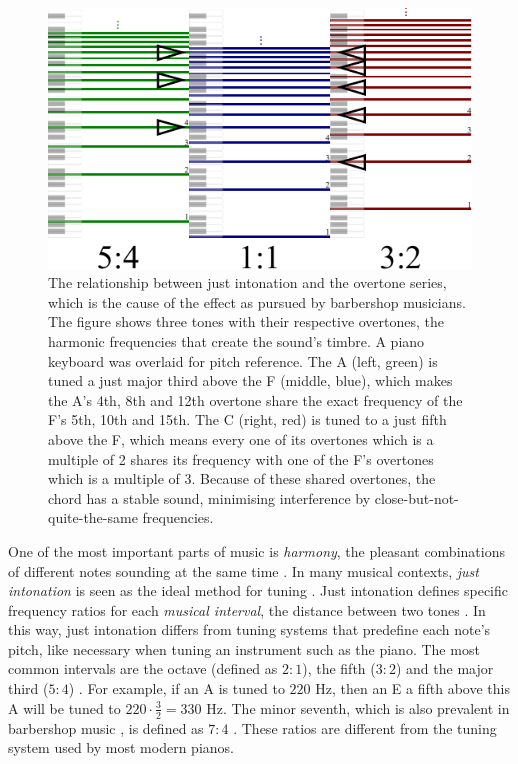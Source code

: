 \documentclass[a4paper]{article}
\begin{document}
\begin{figure}
	\centering
	\includegraphics[height=0.35\textheight]{Figures/overtones.pdf}
	\caption{The relationship between just intonation and the overtone series, which is the cause of the  effect as pursued by barbershop musicians. The figure shows three tones with their respective overtones, the harmonic frequencies that create the sound's timbre. A piano keyboard was overlaid for pitch reference. The A (left, green) is tuned a just major third above the F (middle, blue), which makes the A's 4th, 8th and 12th overtone share the exact frequency of the F's 5th, 10th and 15th. The C (right, red) is tuned to a just fifth above the F, which means every one of its overtones which is a multiple of 2 shares its frequency with one of the F's overtones which is a multiple of 3. Because of these shared overtones, the chord has a stable sound, minimising interference by close-but-not-quite-the-same frequencies.}
	\label{fig:overtones}
\end{figure}

One of the most important parts of music is \textit{harmony}, the pleasant combinations of different notes sounding at the same time \cite{malm_music_1996}. In many musical contexts, {\it just intonation} is seen as the ideal method for tuning \cite{boyden_prelleur_1951}. Just intonation defines specific frequency ratios for each \textit{musical interval}, the distance between two tones \cite{fonville_ben_1991}. In this way, just intonation differs from tuning systems that predefine each note's pitch, like necessary when tuning an instrument such as the piano. The most common intervals are the octave (defined as $2:1$), the fifth ($3:2$) and the major third ($5:4$) \cite{van_de_craats_fis_1989}. For example, if an A is tuned to $220$ Hz, then an E a fifth above this A will be tuned to $220 \cdot \frac32 = 330$ Hz. The minor seventh, which is also prevalent in barbershop music \cite{barbershop_harmony_society_contest_2022}, is defined as $7:4$ \cite{van_de_craats_fis_1989}. These ratios are different from the tuning system used by most modern pianos.
\end{document}
